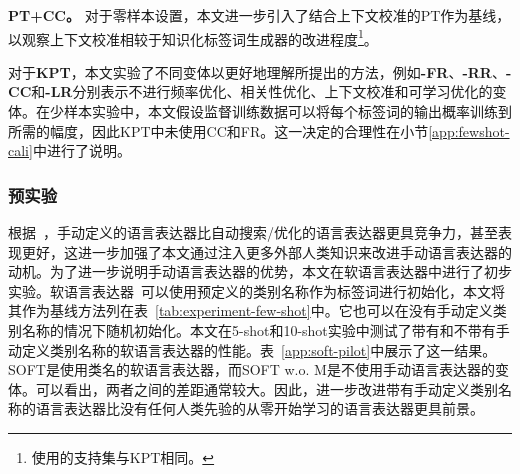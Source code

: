 \textbf{PT+CC。} 对于零样本设置，本文进一步引入了结合上下文校准的PT作为基线，以观察上下文校准相较于知识化标签词生成器的改进程度\footnote{使用的支持集与KPT相同。}。

对于\textbf{KPT}，本文实验了不同变体以更好地理解所提出的方法，例如\textbf{-FR}、\textbf{-RR}、\textbf{-CC}和\textbf{-LR}分别表示不进行频率优化、相关性优化、上下文校准和可学习优化的变体。在少样本实验中，本文假设监督训练数据可以将每个标签词的输出概率训练到所需的幅度，因此KPT中未使用CC和FR。这一决定的合理性在小节\ref{app:fewshot-cali}中进行了说明。


\subsubsection{预实验}
\begin{table}[!htbp]
\caption{预实验证明了在语言表达器中融入人类专家知识的必要性}
\begin{center}
\end{center}
\label{app:soft-pilot}
\end{table}

根据~\citet{gao2020making}，手动定义的语言表达器比自动搜索/优化的语言表达器更具竞争力，甚至表现更好，这进一步加强了本文通过注入更多外部人类知识来改进手动语言表达器的动机。为了进一步说明手动语言表达器的优势，本文在软语言表达器中进行了初步实验。软语言表达器~\cite{hambardzumyan-etal-2021-warp}可以使用预定义的类别名称作为标签词进行初始化，本文将其作为基线方法列在表~\ref{tab:experiment-few-shot}中。它也可以在没有手动定义类别名称的情况下随机初始化。本文在5-shot和10-shot实验中测试了带有和不带有手动定义类别名称的软语言表达器的性能。表~\ref{app:soft-pilot}中展示了这一结果。SOFT是使用类名的软语言表达器，而SOFT w.o. M是不使用手动语言表达器的变体。可以看出，两者之间的差距通常较大。因此，进一步改进带有手动定义类别名称的语言表达器比没有任何人类先验的从零开始学习的语言表达器更具前景。


